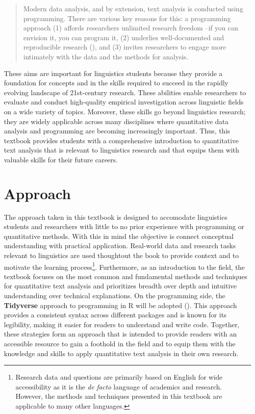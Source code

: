\documentclass[
  letterpaper,
]{book}
\theoremstyle{definition}
\theoremstyle{remark}
\begin{document}
\begin{quote}
Modern data analysis, and by extension, text analysis is conducted using
programming. There are various key reasons for this: a programming
approach (1) affords researchers unlimited research freedom --if you can
envision it, you can program it, (2) underlies well-documented and
reproducible research (), and
(3) invites researchers to engage more intimately with the data and the
methods for analysis.
\end{quote}

These aims are important for linguistics students because they provide a
foundation for concepts and in the skills required to succeed in the
rapidly evolving landscape of 21st-century research. These abilities
enable researchers to evaluate and conduct high-quality empirical
investigation across linguistic fields on a wide variety of topics.
Moreover, these skills go beyond linguistics research; they are widely
applicable across many disciplines where quantitative data analysis and
programming are becoming increasingly important. Thus, this textbook
provides students with a comprehensive introduction to quantitative text
analysis that is relevant to linguistics research and that equips them
with valuable skills for their future careers.

\section*{Approach}\label{sec-preface-approach}


The approach taken in this textbook is designed to accomodate
linguistics students and researchers with little to no prior experience
with programming or quantitative methods. With this in mind the
objective is connect conceptual understanding with practical
application. Real-world data and research tasks relevant to linguistics
are used thoughtout the book to provide context and to motivate the
learning process\footnote{Research data and questions are primarily
  based on English for wide accessibility as it is the \emph{de facto}
  language of academics and research. However, the methods and
  techniques presented in this textbook are applicable to many other
  languages.}. Furthermore, as an introduction to the field, the
textbook focuses on the most common and fundamental methods and
techniques for quantitative text analysis and prioritizes breadth over
depth and intuitive understanding over technical explanations. On the
programming side, the
\textbf{Tidyverse} approach to
programming in R will be adopted (). This approach provides a consistent syntax across different
packages and is known for its legibility, making it easier for readers
to understand and write code. Together, these strategies form an
approach that is intended to provide readers with an accessible resource
to gain a foothold in the field and to equip them with the knowledge and
skills to apply quantitative text analysis in their own research.
\end{document}
